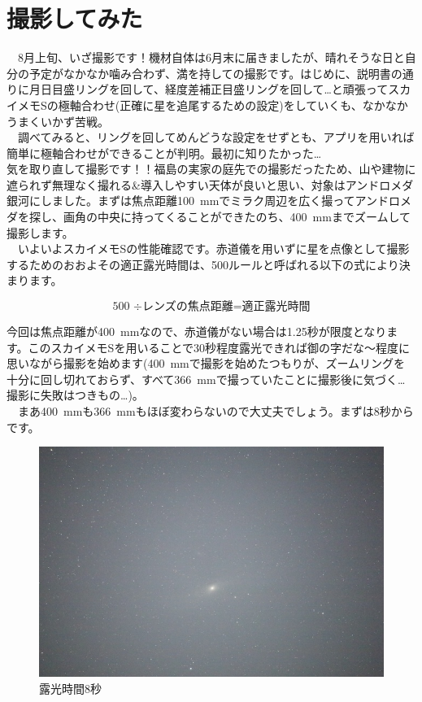 \section{撮影してみた}
　8月上旬、いざ撮影です！機材自体は6月末に届きましたが、晴れそうな日と自分の予定がなかなか噛み合わず、満を持しての撮影です。はじめに、説明書の通りに月日目盛リングを回して、経度差補正目盛リングを回して\dots と頑張ってスカイメモSの極軸合わせ(正確に星を追尾するための設定)をしていくも、なかなかうまくいかず苦戦。\\
　調べてみると、リングを回してめんどうな設定をせずとも、アプリを用いれば簡単に極軸合わせができることが判明。最初に知りたかった\dots\\

気を取り直して撮影です！！福島の実家の庭先での撮影だったため、山や建物に遮られず無理なく撮れる\&導入しやすい天体が良いと思い、対象はアンドロメダ銀河にしました。まずは焦点距離\SI{100}{mm}でミラク周辺を広く撮ってアンドロメダを探し、画角の中央に持ってくることができたのち、\SI{400}{mm}までズームして撮影します。\\
　いよいよスカイメモSの性能確認です。赤道儀を用いずに星を点像として撮影するためのおおよその適正露光時間は、500ルールと呼ばれる以下の式により決まります。

\begin{equation*}
  \text{500 ÷レンズの焦点距離}=\text{適正露光時間}
\end{equation*}

今回は焦点距離が\SI{400}{mm}なので、赤道儀がない場合は1.25秒が限度となります。このスカイメモSを用いることで30秒程度露光できれば御の字だな～程度に思いながら撮影を始めます(\SI{400}{mm}で撮影を始めたつもりが、ズームリングを十分に回し切れておらず、すべて\SI{366}{mm}で撮っていたことに撮影後に気づく\dots 撮影に失敗はつきもの\dots)。\\
　まあ\SI{400}{mm}も\SI{366}{mm}もほぼ変わらないので大丈夫でしょう。まずは8秒からです。\\

\begin{figure}[H]
  \centering
  \includegraphics[width=0.7\linewidth]{sections/Kokubun/pictures/ss8.JPG}
  \caption{露光時間8秒}
  \label{ss8}
\end{figure}

